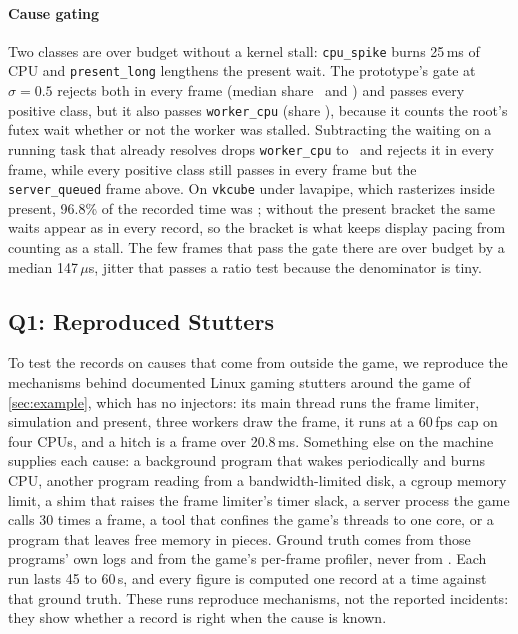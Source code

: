 \paragraph{Cause gating}
\label{sec:eval-gate}
Two classes are over budget without a kernel stall: \texttt{cpu\_spike}
burns 25\,ms of CPU and \texttt{present\_long} lengthens the present wait.
The prototype's gate at $\sigma=0.5$ rejects both in every frame (median
share \hbcpuspikeShare\ and \hbpresentlongShare) and passes every positive
class, but it also passes \texttt{worker\_cpu} (share \hbworkercpuShare),
because it counts the root's futex wait whether or not the worker was
stalled. Subtracting the waiting on a running task that \sys already
resolves drops \texttt{worker\_cpu} to \hbworkercpuRShare\ and rejects it
in every frame, while every positive class still passes in every frame but
the \texttt{server\_queued} frame above. On \texttt{vkcube} under lavapipe,
which rasterizes inside present, 96.8\% of the recorded time was
; without the present bracket the same waits appear
as  in every record, so the bracket is what keeps display
pacing from counting as a stall. The few frames that pass the gate there are
over budget by a median 147\,$\mu$s, jitter that passes a ratio test
because the denominator is tiny. 

\subsection{Q1: Reproduced Stutters}
\label{sec:eval-cases}

To test the records on causes that come from outside the game, we
reproduce the mechanisms behind documented Linux gaming stutters around the
game of \autoref{sec:example}, which has no injectors: its main thread runs
the frame limiter, simulation and present, three workers draw the frame,
it runs at a 60\,fps cap on four CPUs, and a hitch is a frame over
20.8\,ms. Something else on the machine supplies each cause:
a background program that wakes periodically and burns CPU, another program
reading from a bandwidth-limited disk, a cgroup memory limit, a shim that
raises the frame limiter's timer slack, a server process the game calls 30
times a frame, a tool that confines the game's threads to one core, or a
program that leaves free memory in pieces. Ground truth comes from those
programs' own logs and from the game's per-frame profiler, never from \sys.
Each run lasts 45 to 60\,s, and every figure is computed one record at a
time against that ground truth. These runs reproduce mechanisms, not the
reported incidents: they show whether a record is right when the cause is
known.

